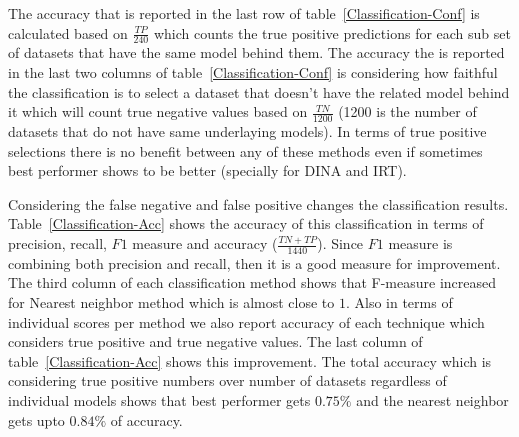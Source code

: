 The accuracy that is reported in the last row of table~\ref{Classification-Conf} is calculated based on $\frac{TP}{240}$ which counts the true positive predictions for each sub set of datasets that have the same model behind them. The accuracy the is reported in the last two columns of table~\ref{Classification-Conf} is considering how faithful the classification is to select a dataset that doesn't have the related model behind it which will count true negative values based on $\frac{TN}{1200}$ (1200 is the number of datasets that do not have same underlaying models). In terms of true positive selections there is no benefit between any of these methods even if sometimes best performer shows to be better (specially for DINA and IRT).

Considering the false negative and false positive changes the classification results. Table~\ref{Classification-Acc} shows the accuracy of this classification in terms of precision, recall, $F1$ measure and accuracy ($\frac{TN+TP}{1440}$). Since $F1$ measure is combining both precision and recall, then it is a good measure for improvement. The third column of each classification method shows that F-measure increased for Nearest neighbor method which is almost close to $1$. Also in terms of individual scores per method we also report accuracy of each technique which considers true positive and true negative values. The last column of table~\ref{Classification-Acc} shows this improvement. The total accuracy which is considering true positive numbers over number of datasets regardless of individual models shows that best performer  gets $0.75\%$ and the nearest neighbor gets upto $0.84\%$ of accuracy.


